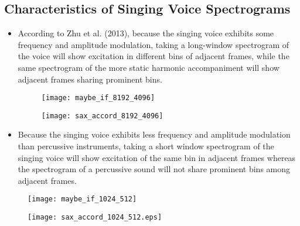 \documentclass[72pt]{article}
\begin{document}
\begin{Huge}
\newpage

\section*{Characteristics of Singing Voice Spectrograms}
\begin{itemize}
    \item According to Zhu et al. (2013), because the singing voice exhibits
some frequency and amplitude modulation, taking a long-window spectrogram of the
voice will show excitation in different bins of adjacent frames, while the same
spectrogram of the more static harmonic accompaniment will show adjacent frames
sharing prominent bins.

\newpage


\begin{figure}[H]
    \centering
    \texttt{[image: maybe\_if\_8192\_4096]}
\end{figure}

\newpage

\begin{figure}[H]
    \centering
    \texttt{[image: sax\_accord\_8192\_4096]}
\end{figure}

\newpage

    \item Because the singing voice exhibits less frequency and amplitude
    modulation than percussive instruments, taking a short window spectrogram of
    the singing voice will show excitation of the same bin in adjacent frames
    whereas the spectrogram of a percussive sound will not share prominent bins
    among adjacent frames.
\end{itemize}

\newpage


\begin{figure}[H]
    \centering
    \texttt{[image: maybe\_if\_1024\_512]}
\end{figure}

\newpage

\begin{figure}[H]
    \centering
    \texttt{[image: sax\_accord\_1024\_512.eps]}
\end{figure}

\newpage



\end{Huge}
\end{document}
